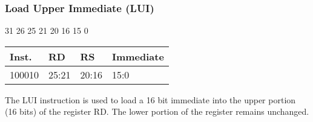\documentclass[12pt]{article}
\begin{document}

    \newpage
    \subsubsection{Load Upper Immediate (LUI)}
    
    \hspace{1.6cm}31 \hspace{1.15cm}26 \hspace{.05cm}25 \hspace{.8cm}21 \hspace{.05cm}20 \hspace{.8cm}16 \hspace{.05cm}15 \hspace{6.4cm}0
    \vspace{-.25cm}
    \begin{center}
        \begin{tabular}{ |p{1.8cm}|p{1.5cm}|p{1.5cm}|p{6.8cm}| }
            \hline
            \textbf{Inst.} & \textbf{RD} &  \textbf{RS} & \textbf{Immediate}\\
            \hline
            100010& 25:21 & 20:16 &15:0\\
            \hline
        \end{tabular}
    \end{center}
    
    \noindent
    The LUI instruction is used to load a 16 bit immediate into the upper portion (16 bits) of the register RD. The lower portion of the register remains unchanged. 
    
\end{document}
